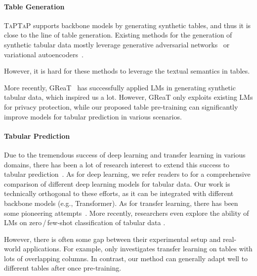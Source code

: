 \paragraph{Table Generation}

\textsc{TaPTaP} supports backbone models by generating synthetic tables, and thus it is close to the line of table generation. Existing methods for the generation of synthetic tabular data mostly leverage generative adversarial networks~\citep{DBLP:conf/mlhc/ChoiBMDSS17,DBLP:journals/pvldb/ParkMGJPK18,DBLP:journals/corr/abs-1807-06657,DBLP:conf/nips/CTGAN,DBLP:journals/jamia/KoivuSAP20} or variational autoencoders~\citep{DBLP:conf/nips/CTGAN,DBLP:conf/nips/MaTTHZ20,DBLP:journals/corr/abs-2105-08204}.

However, it is hard for these methods to leverage the textual semantics in tables.

More recently, GReaT~\citep{GReaT} has successfully applied LMs in generating synthetic tabular data, which inspired us a lot. However, GReaT only exploits existing LMs for privacy protection, while our proposed table pre-training can significantly improve models for tabular prediction in various scenarios.

\paragraph{Tabular Prediction}

Due to the tremendous success of deep learning and transfer learning in various domains, there has been a lot of research interest to extend this success to tabular prediction~\citep{DBLP:conf/cikm/Autoint,DBLP:conf/www/DCNV2,DBLP:conf/aaai/Tabnet}. As for deep learning, we refer readers to \citet{revisiting} for a comprehensive comparison of different deep learning models for tabular data. Our work is technically orthogonal to these efforts, as it can be integrated with different backbone models (e.g., Transformer). As for transfer learning, there has been some pioneering attempts~\citep{DBLP:journals/corr/Transfer,DBLP:journals/corr/TransTab}. More recently, researchers even explore the ability of LMs on zero\,/\,few-shot classification of tabular data \citep{tabllm}.

However, there is often some gap between their experimental setup and real-world applications. For example, \citet{DBLP:journals/corr/Transfer} only investigates transfer learning on tables with lots of overlapping columns. In contrast, our method can generally adapt well to different tables after once pre-training.

